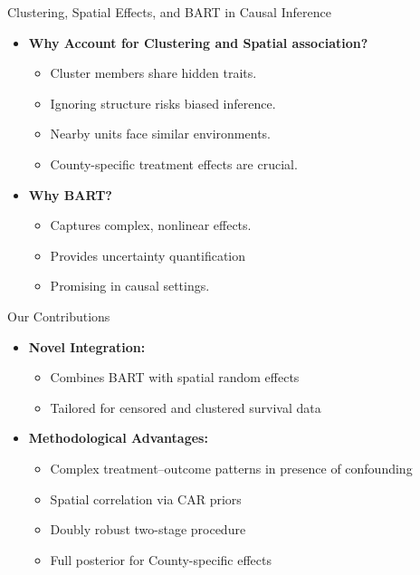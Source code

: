 \documentclass{beamer}
\begin{document}
\begin{frame}{Clustering, Spatial Effects, and BART in Causal Inference}
    \begin{itemize}
      \vfill \item \textbf{Why Account for Clustering and Spatial association?}
      \begin{itemize}
        \vfill \item Cluster members share hidden traits.
        \vfill \item Ignoring structure risks biased inference.
        \vfill \item Nearby units face similar environments.
        \vfill \item County-specific treatment effects are crucial.
      \end{itemize}
      \vspace{6pt}
      \vfill \item \textbf{Why BART?}
      \begin{itemize}
        \vfill \item Captures complex, nonlinear effects.
        \vfill \item Provides  uncertainty quantification
        \vfill \item Promising in causal settings.
      \end{itemize}
    \end{itemize}
    \end{frame}


\begin{frame}{Our Contributions}
    \begin{itemize}
      \vfill \item \textbf{Novel Integration:}
      \begin{itemize}
        \vfill \item Combines BART with spatial random effects
        \vfill \item Tailored for censored and clustered survival data
      \end{itemize}
      \vspace{6pt}
      \vfill \item \textbf{Methodological Advantages:}
      \begin{itemize}
        \vfill \item Complex treatment–outcome patterns in presence of confounding
        \vfill \item Spatial correlation via CAR priors

        \vfill \item Doubly robust two-stage procedure
        \vfill \item Full posterior for County-specific effects
      \end{itemize}
    \end{itemize}
    \end{frame}
\end{document}
